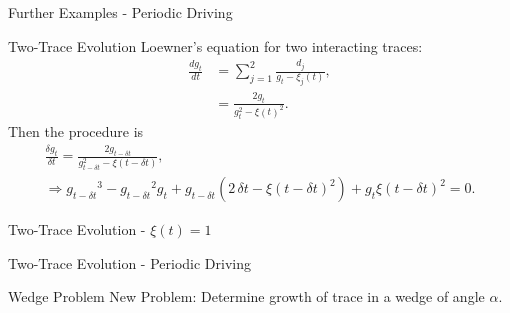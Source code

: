 \documentclass{beamer}
\begin{document}
\begin{frame}{Further Examples - Periodic Driving}
\begin{adjustbox}{max totalsize={\textwidth}{\textheight}}

\end{adjustbox}
\end{frame}

\begin{frame}{Two-Trace Evolution}
    Loewner's equation for two interacting traces:
    \begin{align*}
        \frac{dg_t}{dt} &= \sum_{j=1}^2 \frac{d_j}{g_t - \xi_j (t)}, \\
        &= \frac{2g_t}{g_t^2 - \xi(t)^2}.
    \end{align*}
    Then the procedure is
    \begin{gather*}
        \frac{\delta g_t}{\delta t} =  \frac{2g_{t - \delta t}}{g_{t - \delta t}^2 - \xi(t - \delta t)}, \\
     \Rightarrow {g_{t - \delta t}}^{3} - {g_{t - \delta t}}^{2} {g_t} + {g_{t -\delta t}} (2 \, {\delta t} - {\xi(t - \delta t)}^{2} ) + {g_t} {\xi(t - \delta t)}^{2} = 0.
    \end{gather*}
\end{frame}

\begin{frame}{Two-Trace Evolution - $\xi(t) = 1$}
\begin{adjustbox}{max totalsize={\textwidth}{\textheight}}

\end{adjustbox}
\end{frame}

\begin{frame}{Two-Trace Evolution - Periodic Driving}
\begin{adjustbox}{max totalsize={\textwidth}{0.85\textheight}, center}

\end{adjustbox}
\end{frame}

\begin{frame}{Wedge Problem}
    New Problem: Determine growth of trace in a wedge of angle $\alpha$.\\[10pt]
\begin{adjustbox}{max totalsize={\textwidth}{\textheight}, center}

\end{adjustbox}
\end{frame}
\end{document}
